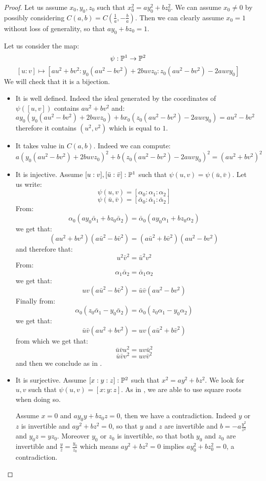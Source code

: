\begin{proof}
Let us assume $x_0,y_0,z_0$ such that $x_0^2 = ay_0^2+bz_0^2$. We can assume $x_0\not=0$ by possibly considering $C(a,b) = C(\frac{1}{a},-\frac{b}{a})$. Then we can clearly assume $x_0=1$ without loss of generality, so that $ay_0 + bz_0 = 1$.

 Let us consider the map:
\[\psi:\mathbb{P}^1\to \mathbb{P}^2\]
\[[u:v] \mapsto [au^2+bv^2: y_0(au^2-bv^2) + 2buvz_0 : z_0(au^2-bv^2) - 2auvy_0]\]
We will check that it is a bijection.
\begin{itemize}

\item It is well defined. Indeed the ideal generated by the coordinates of $\psi([u,v])$ contains $au^2+bv^2$ and:
\[ay_0(y_0(au^2-bv^2) + 2buvz_0) + bx_0(z_0(au^2-bv^2) - 2auvy_0) = au^2-bv^2\]
therefore it contains $(u^2,v^2)$ which is equal to $1$.

\item It takes value in $C(a,b)$. Indeed we can compute:
\[ a\left( y_0(au^2-bv^2) + 2buvz_0\right)^2 + b\left(z_0(au^2-bv^2) - 2auvy_0\right)^2 = (au^2+bv^2)^2\]

\item It is injective. Assume $[u:v],[\bar{u}:\bar{v}]:\mathbb{P}^1$ such that $\psi(u,v) = \psi(\bar{u},\bar{v})$. Let us write: 
\[\psi(u,v) = [\alpha_0:\alpha_1:\alpha_2]\]
\[\psi(\bar{u},\bar{v}) = [\bar{\alpha}_0:\bar{\alpha}_1:\bar{\alpha}_2]\]
From:
\[\alpha_0(ay_0\bar{\alpha}_1 + bz_0\bar{\alpha}_2) = \bar{\alpha}_0(ay_0\alpha_1 + bz_0\alpha_2)\]
we get that:
\[(au^2+bv^2)(a\bar{u}^2-b\bar{v}^2)= (a\bar{u}^2+b\bar{v}^2)(au^2-bv^2)\]
and therefore that:
\[u^2\bar{v}^2 = \bar{u}^2v^2\]
From:
\[\alpha_1\bar{\alpha}_2 = \bar{\alpha}_1\alpha_2\]
we get that:
\[uv(a\bar{u}^2-b\bar{v}^2) = \bar{u}\bar{v}(au^2-bv^2)\]
Finally from:
\[\alpha_0(z_0\bar{\alpha}_1-y_0\bar{\alpha}_2) = \bar{\alpha}_0(z_0\alpha_1-y_0\alpha_2)\]
we get that:
\[\bar{u}\bar{v}(au^2+bv^2) = uv(a\bar{u}^2+b\bar{v}^2)\]
from which we get that:
\[\bar{u}\bar{v}u^2 = uv\bar{u}^2\]
\[\bar{u}\bar{v}v^2 = uv\bar{v}^2\]
and then we conclude as in .

\item It is surjective. Assume $[x:y:z]:\mathbb{P}^2$ such that $x^2=ay^2+bz^2$. We look for $u,v$ such that $\psi(u,v) = [x:y:z]$. As in , we are able to use square roots when doing so. 

Assume $x=0$ and $ay_0y+bz_0z=0$, then we have a contradiction. Indeed $y$ or $z$ is invertible and $ay^2+bz^2=0$, so that $y$ and $z$ are invertible and $b = -a\frac{y^2}{z^2}$ and $y_0z=yz_0$. Moreover $y_0$ or $z_0$ is invertible, so that both $y_0$ and $z_0$ are invertible and $\frac{y}{z} = \frac{y_0}{z_0}$ which means $ay^2+bz^2=0$ implies $ay_0^2+bz_0^2=0$, a contradiction.


\end{itemize}
\end{proof}
